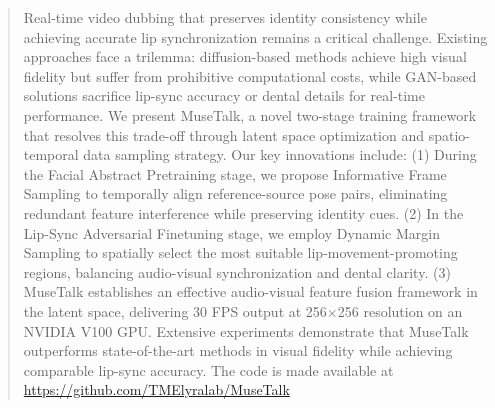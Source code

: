 
\begin{abstract}
Real-time video dubbing that preserves identity consistency while achieving accurate lip synchronization remains a critical challenge. 
Existing approaches face a trilemma: diffusion-based methods achieve high visual fidelity but suffer from prohibitive computational costs, while GAN-based solutions sacrifice lip-sync accuracy or dental details for real-time performance. We present MuseTalk, a novel two-stage training framework that resolves this trade-off through latent space optimization and spatio-temporal data sampling strategy. 
Our key innovations include:
(1) During the Facial Abstract Pretraining stage, we propose Informative Frame Sampling to temporally align reference-source pose pairs, eliminating redundant feature interference while preserving identity cues.
(2) In the Lip-Sync Adversarial Finetuning stage, we employ Dynamic Margin Sampling to spatially select the most suitable lip-movement-promoting regions, balancing audio-visual synchronization and dental clarity.
(3) MuseTalk establishes an effective audio-visual feature fusion framework in the latent space, delivering 30 FPS output at 256×256 resolution on an NVIDIA V100 GPU.
Extensive experiments demonstrate that MuseTalk outperforms state-of-the-art methods in visual fidelity while achieving comparable lip-sync accuracy. 
The code is made available at \href{https://github.com/TMElyralab/MuseTalk}{https://github.com/TMElyralab/MuseTalk}
\end{abstract}

